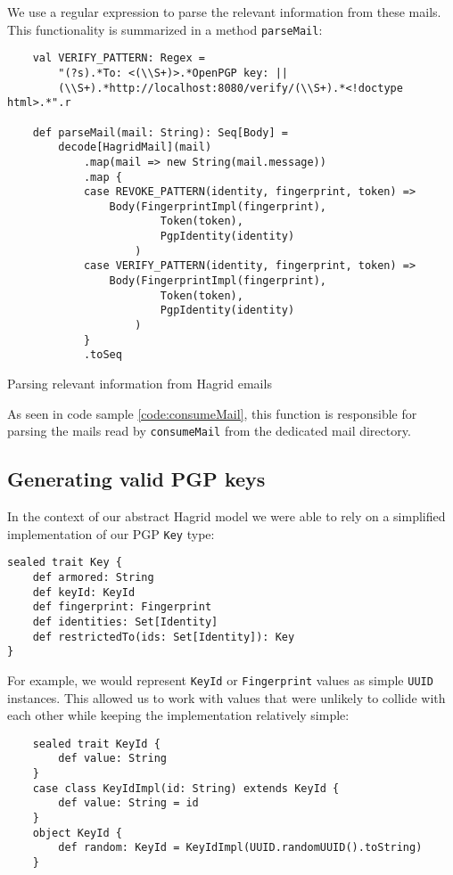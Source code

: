 We use a regular expression to parse the relevant information from these mails. This functionality is summarized in a method \texttt{parseMail}:
\begin{code}
    \begin{verbatim}
    val VERIFY_PATTERN: Regex = 
        "(?s).*To: <(\\S+)>.*OpenPGP key: ||
        (\\S+).*http://localhost:8080/verify/(\\S+).*<!doctype html>.*".r

    def parseMail(mail: String): Seq[Body] =
        decode[HagridMail](mail)
            .map(mail => new String(mail.message))
            .map {
            case REVOKE_PATTERN(identity, fingerprint, token) => 
                Body(FingerprintImpl(fingerprint), 
                        Token(token), 
                        PgpIdentity(identity)
                    )
            case VERIFY_PATTERN(identity, fingerprint, token) => 
                Body(FingerprintImpl(fingerprint), 
                        Token(token), 
                        PgpIdentity(identity)
                    )
            }
            .toSeq
    \end{verbatim}
    \caption{Parsing relevant information from Hagrid emails}
\end{code}

As seen in code sample \ref{code:consumeMail}, this function is responsible for parsing the mails read by \texttt{consumeMail} from the dedicated mail directory.

\subsection{Generating valid PGP keys}
In the context of our abstract Hagrid model we were able to rely on a simplified implementation of our PGP \texttt{Key} type: 
\begin{verbatim}
sealed trait Key {
    def armored: String
    def keyId: KeyId
    def fingerprint: Fingerprint
    def identities: Set[Identity]
    def restrictedTo(ids: Set[Identity]): Key
}
\end{verbatim} 
For example, we would represent \texttt{KeyId} or \texttt{Fingerprint} values as simple \texttt{UUID} instances. This allowed us to work with values that were unlikely to collide with each other while keeping the implementation relatively simple:
\begin{verbatim}
    sealed trait KeyId {
        def value: String
    }
    case class KeyIdImpl(id: String) extends KeyId {
        def value: String = id
    }
    object KeyId {
        def random: KeyId = KeyIdImpl(UUID.randomUUID().toString)
    }
\end{verbatim}

